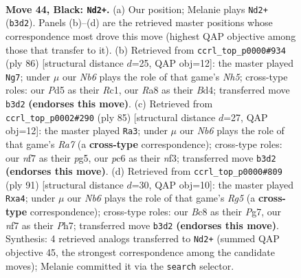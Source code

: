 \documentclass[11pt]{article}
\begin{document}
\clearpage

\begin{figure}[p]\centering
\begin{subfigure}{0.46\textwidth}\centering
\resizebox{\linewidth}{!}{%
\newchessgame
\chessboard[
  setfen={r1b5/5N1k/2P1p3/Pp1pB3/8/1nP2K2/8/6R1 b - - 11 44},
  showmover=false,
  pgfstyle=straightmove, color=movearrow, markmove={b3-d2}
]}
\caption{}
\end{subfigure}\hfill
\begin{subfigure}{0.46\textwidth}\centering
\resizebox{\linewidth}{!}{%
\newchessgame
\chessboard[
  setfen={3br3/1p6/3k4/p2n3N/P2B1pP1/1P3K2/8/2R5 w - - 4 44},
  showmover=false,
  pgfstyle=straightmove, color=movearrow, markmove={h5-g7}
]}
\caption{}
\end{subfigure}
\\[4pt]
\begin{subfigure}{0.46\textwidth}\centering
\resizebox{\linewidth}{!}{%
\newchessgame
\chessboard[
  setfen={R7/p4pk1/4p3/1P4P1/P7/5N1K/rb6/8 b - - 6 43},
  showmover=false,
  pgfstyle=straightmove, color=movearrow, markmove={a2-a3}
]}
\caption{}
\end{subfigure}\hfill
\begin{subfigure}{0.46\textwidth}\centering
\resizebox{\linewidth}{!}{%
\newchessgame
\chessboard[
  setfen={2k5/2p3pp/4Pb2/p1BP4/P5r1/8/7K/4R3 b - - 2 46},
  showmover=false,
  pgfstyle=straightmove, color=movearrow, markmove={g4-a4}
]}
\caption{}
\end{subfigure}
\caption{\textbf{Move 44, Black: \texttt{Nd2+}.} (a) Our position; Melanie plays \texttt{Nd2+} (\texttt{b3d2}). Panels (b)--(d) are the retrieved master positions whose correspondence most drove this move (highest QAP objective among those that transfer to it). (b) Retrieved from \texttt{ccrl\_top\_p0000\#934} (ply 86) [structural distance $d$=25, QAP obj=12]: the master played \texttt{Ng7}; under $\mu$ our \emph{Nb6} plays the role of that game's \emph{Nh5}; cross-type roles: our \emph{P}d5 as their \emph{R}c1, our \emph{R}a8 as their \emph{B}d4; transferred move \texttt{b3d2} \textbf{(endorses this move)}. (c) Retrieved from \texttt{ccrl\_top\_p0002\#290} (ply 85) [structural distance $d$=27, QAP obj=12]: the master played \texttt{Ra3}; under $\mu$ our \emph{Nb6} plays the role of that game's \emph{Ra7} (a \textbf{cross-type} correspondence); cross-type roles: our \emph{n}f7 as their \emph{p}g5, our \emph{p}c6 as their \emph{n}f3; transferred move \texttt{b3d2} \textbf{(endorses this move)}. (d) Retrieved from \texttt{ccrl\_top\_p0000\#809} (ply 91) [structural distance $d$=30, QAP obj=10]: the master played \texttt{Rxa4}; under $\mu$ our \emph{Nb6} plays the role of that game's \emph{Rg5} (a \textbf{cross-type} correspondence); cross-type roles: our \emph{B}c8 as their \emph{P}g7, our \emph{n}f7 as their \emph{P}h7; transferred move \texttt{b3d2} \textbf{(endorses this move)}. Synthesis: 4 retrieved analogs transferred to \texttt{Nd2+} (summed QAP objective 45, the strongest correspondence among the candidate moves); Melanie committed it via the \texttt{search} selector.}
\label{fig:thought-m87}
\end{figure}
\end{document}
